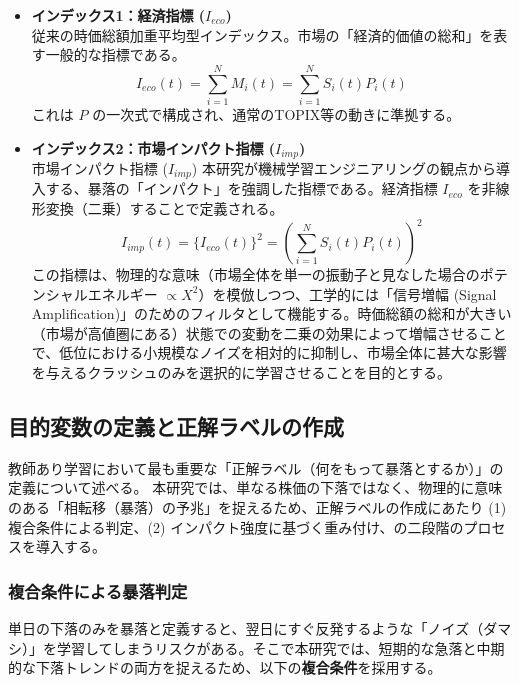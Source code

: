 \documentclass[11pt,a4paper,oneside]{ltjsarticle}
\begin{document}
\begin{itemize}
    \item \textbf{インデックス1：経済指標 ($I_{eco}$)} \\
    従来の時価総額加重平均型インデックス。市場の「経済的価値の総和」を表す一般的な指標である。
    \begin{equation}
    I_{eco}(t) = \sum_{i=1}^{N} M_i(t) = \sum_{i=1}^{N} S_i(t) P_i(t)
    \end{equation}
    これは $P$ の一次式で構成され、通常のTOPIX等の動きに準拠する。
    
    \item \textbf{インデックス2：市場インパクト指標 ($I_{imp}$)} \\
    市場インパクト指標 ($I_{imp}$)
本研究が機械学習エンジニアリングの観点から導入する、暴落の「インパクト」を強調した指標である。経済指標 $I_{eco}$ を非線形変換（二乗）することで定義される。
    \begin{equation}
   I_{imp}(t) = \{ I_{eco}(t) \}^{2} = \left( \sum_{i=1}^{N} S_{i}(t) P_{i}(t) \right)^{2}
    \end{equation}
   この指標は、物理的な意味（市場全体を単一の振動子と見なした場合のポテンシャルエネルギー $\propto X^2$）を模倣しつつ、工学的には「信号増幅 (Signal Amplification)」のためのフィルタとして機能する。時価総額の総和が大きい（市場が高値圏にある）状態での変動を二乗の効果によって増幅させることで、低位における小規模なノイズを相対的に抑制し、市場全体に甚大な影響を与えるクラッシュのみを選択的に学習させることを目的とする。
\end{itemize}

\subsection{目的変数の定義と正解ラベルの作成}
教師あり学習において最も重要な「正解ラベル（何をもって暴落とするか）」の定義について述べる。
本研究では、単なる株価の下落ではなく、物理的に意味のある「相転移（暴落）の予兆」を捉えるため、正解ラベルの作成にあたり (1) 複合条件による判定、(2) インパクト強度に基づく重み付け、の二段階のプロセスを導入する。

\subsubsection{複合条件による暴落判定}
単日の下落のみを暴落と定義すると、翌日にすぐ反発するような「ノイズ（ダマシ）」を学習してしまうリスクがある。そこで本研究では、短期的な急落と中期的な下落トレンドの両方を捉えるため、以下の\textbf{複合条件}を採用する。
\end{document}
